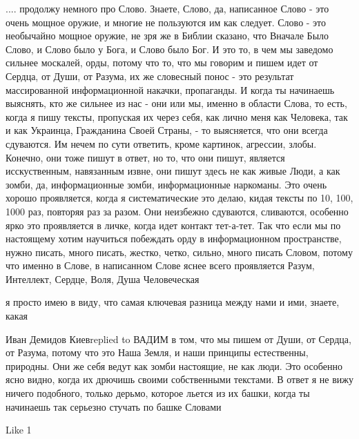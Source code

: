  
 
 
 
 

.... продолжу немного про Слово. Знаете, Слово, да, написанное Слово - это
очень мощное оружие, и многие не пользуются им как следует. Слово - это
необычайно мощное оружие, не зря же в Библии сказано, что Вначале Было Слово, и
Слово было у Бога, и Слово было Бог. И это то, в чем мы заведомо сильнее
москалей, орды, потому что то, что мы говорим и пишем идет от Сердца, от Души,
от Разума, их же словесный понос - это результат массированной информационной
накачки, пропаганды. И когда ты начинаешь выяснять, кто же сильнее из нас - они
или мы, именно в области Слова, то есть, когда я пишу тексты, пропуская их
через себя, как лично меня как Человека, так и как Украинца, Гражданина Своей
Страны, - то выясняется, что они всегда сдуваются. Им нечем по сути ответить,
кроме картинок, агрессии, злобы. Конечно, они тоже пишут в ответ, но то, что
они пишут, является исскуственным, навязанным извне, они пишут здесь не как
живые Люди, а как зомби, да, информационные зомби, информационные наркоманы.
Это очень хорошо проявляется, когда я систематические это делаю, кидая тексты
по 10, 100, 1000 раз, повторяя раз за разом. Они неизбежно сдуваются,
сливаются, особенно ярко это проявляется в личке, когда идет контакт тет-а-тет.
Так что если мы по настоящему хотим научиться побеждать орду в информационном
пространстве, нужно писать, много писать, жестко, четко, сильно, много писать
Словом, потому что именно в Слове, в написанном Слове яснее всего проявляется
Разум, Интеллект, Сердце, Воля, Душа Человеческая

я просто имею в виду, что самая ключевая разница между нами и ими, знаете, какая

Иван Демидов Киевreplied to ВАДИМ
в том, что мы пишем от Души, от Сердца, от Разума, потому что это Наша Земля, и наши принципы естественны, природны. Они же себя ведут как зомби настоящие, не как люди. Это особенно ясно видно, когда их дрючишь своими собственными текстами. В ответ я не вижу ничего подобного, только дерьмо, которое льется из их башки, когда ты начинаешь так серьезно стучать по башке Словами

    Like 1

